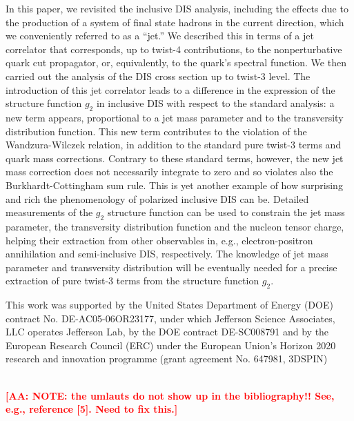 \documentclass[preprintnumbers,floatfix,nofootinbib]{revtex4}
\def\AAcom#1{{\bf  \textcolor{Red}{[AA: {#1}]}}}
\begin{document}
In this paper, we revisited the inclusive DIS analysis, including the
effects due to the production of a system of final state hadrons in the current direction, which we
conveniently referred to as a ``jet.'' We described this in terms of a jet
correlator that corresponds, up to twist-4 contributions, to the nonperturbative quark cut propagator, or, equivalently, to the quark's spectral function. 
We then carried out the analysis of 
the DIS cross section up to twist-3 level. 
The introduction of this jet correlator
leads to a difference in the expression of the structure function $g_2$ in
inclusive DIS with respect to the standard analysis: a new term appears, proportional to a jet mass
parameter and to the transversity distribution function. This new term
contributes to the violation of the Wandzura-Wilczek relation, in addition to
the standard pure twist-3 terms and quark mass corrections. Contrary to these
standard terms, however, the new jet mass correction does not necessarily integrate to zero and so violates also the
Burkhardt-Cottingham sum rule. This is yet another example of how surprising
and rich the phenomenology of polarized inclusive DIS can be. 
Detailed measurements of the $g_2$ structure
function can be used to constrain the jet mass parameter, the transversity
distribution function and the nucleon tensor charge, helping their extraction from other observables in, e.g.,
electron-positron annihilation and semi-inclusive DIS, respectively. 
The
knowledge of jet
mass parameter and transversity distribution will be eventually needed for a precise
extraction of pure twist-3 terms from the structure function $g_2$.




\begin{acknowledgments}
This work was supported by the United States Department of Energy (DOE) contract No. DE-AC05-06OR23177,
under which Jefferson Science Associates, LLC operates Jefferson Lab, by the DOE contract DE-SC008791 and 
by the European Research Council (ERC) under the European Union's 
Horizon 2020 research and innovation programme (grant agreement No. 647981,
3DSPIN)
\end{acknowledgments}

\ \\ \AAcom{NOTE: the umlauts do not show up in the bibliography!! See, e.g., reference [5]. Need to fix this.}



\end{document}
